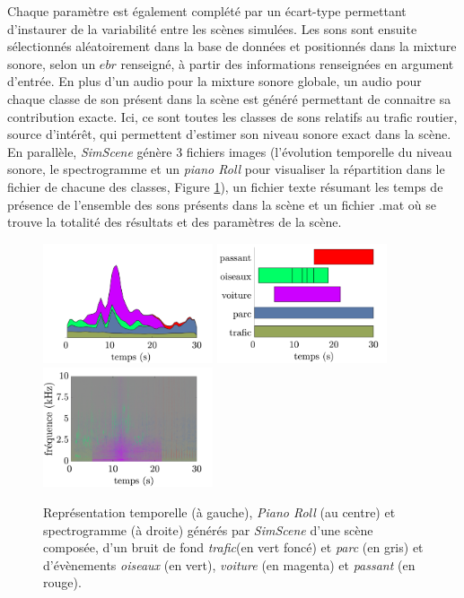 Chaque paramètre est également complété par un écart-type permettant d'instaurer de la variabilité entre les scènes simulées. Les sons sont ensuite sélectionnés aléatoirement dans la base de données et positionnés dans la mixture sonore, selon un $ebr$ renseigné, à partir des informations renseignées en argument d'entrée. En plus d'un audio pour la mixture sonore globale, un audio pour chaque classe de son présent dans la scène est généré permettant de connaitre sa contribution exacte. Ici, ce sont toutes les classes de sons relatifs au trafic routier, source d'intérêt, qui permettent d'estimer son niveau sonore exact dans la scène.\\

En parallèle, \textit{SimScene} génère 3 fichiers images (l'évolution temporelle du niveau sonore, le spectrogramme et un \textit{piano Roll} pour visualiser la répartition dans le fichier de chacune des classes, Figure \ref{fig:somefiglabel}), un fichier texte résumant les temps de présence de l'ensemble des sons présents dans la scène et un fichier .mat où se trouve la totalité des résultats et des paramètres de la scène.\\



\begin{figure}[ht]
\includegraphics[width=5cm]{./figures/SimScene/exemple-timeDomain.pdf}\hfill
\includegraphics[width=5cm]{./figures/SimScene/exemple-pianoRoll.pdf}\hfill
\includegraphics[width=5cm]{./figures/SimScene/exemple-spectrum.pdf}
\caption{Représentation temporelle (à gauche), \textit{Piano Roll} (au centre) et spectrogramme (à droite) générés par \textit{SimScene} d'une scène composée, d'un bruit de fond \textit{trafic}(en vert foncé) et \textit{parc} (en gris) et d'évènements \textit{oiseaux} (en vert), \textit{voiture} (en magenta) et \textit{passant} (en rouge).}\label{fig:somefiglabel}
\end{figure}

